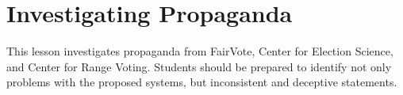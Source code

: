 \label{cur:propaganda}
\section{Investigating Propaganda}

This lesson investigates propaganda from FairVote, Center for Election Science, and Center for Range Voting.  Students should be prepared to identify not only problems with the proposed systems, but inconsistent and deceptive statements.